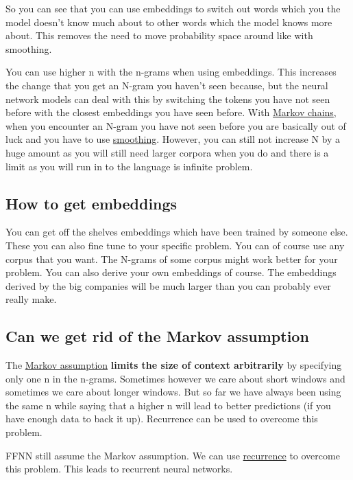 \documentclass[
  11pt,
  british,
]{article}
\begin{document}
So you can see that you can use embeddings to switch out words which you
the model doesn't know much about to other words which the model knows
more about. This removes the need to move probability space around like
with smoothing.

You can use higher n with the n-grams when using embeddings. This
increases the change that you get an N-gram you haven't seen because,
but the neural network models can deal with this by switching the tokens
you have not seen before with the closest embeddings you have seen
before. With \href{Markov\%20models.md}{Markov chains}, when you
encounter an N-gram you have not seen before you are basically out of
luck and you have to use \href{Smoothing.md}{smoothing}. However, you
can still not increase N by a huge amount as you will still need larger
corpora when you do and there is a limit as you will run in to the
language is infinite problem.

\hypertarget{how-to-get-embeddings}{%
\subsection{How to get embeddings}\label{how-to-get-embeddings}}

You can get off the shelves embeddings which have been trained by
someone else. These you can also fine tune to your specific problem. You
can of course use any corpus that you want. The N-grams of some corpus
might work better for your problem. You can also derive your own
embeddings of course. The embeddings derived by the big companies will
be much larger than you can probably ever really make.

\hypertarget{can-we-get-rid-of-the-markov-assumption}{%
\subsection{Can we get rid of the Markov
assumption}\label{can-we-get-rid-of-the-markov-assumption}}

The \href{Markov\%20assumption.md}{Markov assumption} \textbf{limits the
size of context arbitrarily} by specifying only one n in the n-grams.
Sometimes however we care about short windows and sometimes we care
about longer windows. But so far we have always been using the same n
while saying that a higher n will lead to better predictions (if you
have enough data to back it up). Recurrence can be used to overcome this
problem.

FFNN still assume the Markov assumption. We can use
\href{Recurrence.md}{recurrence} to overcome this problem. This leads to
recurrent neural networks.
\end{document}
